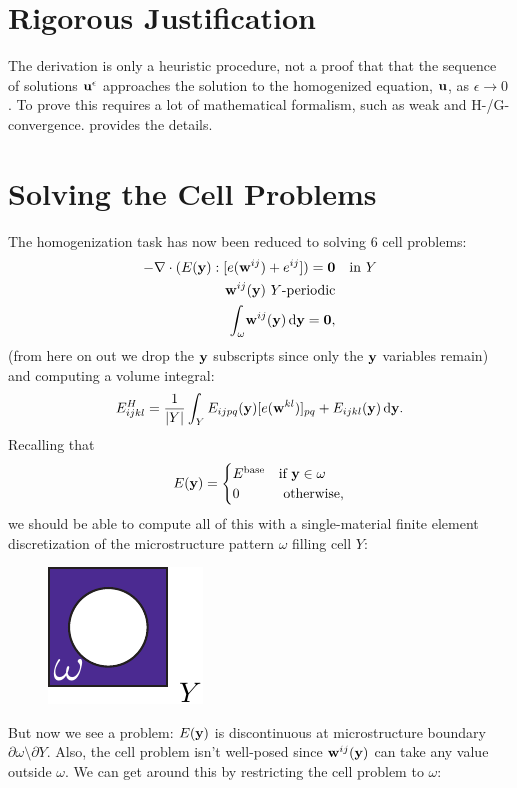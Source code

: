 \documentclass[10pt]{article}
\providecommand{\e}{\epsilon}
\begin{document}
\section{Rigorous Justification}
The derivation is only a heuristic procedure, not a proof that that the
sequence of solutions ${\bf u}^\e$ approaches the solution to the
homogenized equation, ${\bf u}$, as $\e \to 0$ . To prove this requires a lot of mathematical
formalism, such as weak and H-/G-convergence. \cite{allaire2002shape} provides the details.

\section{Solving the Cell Problems}
The homogenization task has now been reduced to solving 6 cell problems:
\begin{align*}
    -\nabla \cdot (E({\bf y}) : [e({\bf w}^{ij}) + e^{ij}]) = {\bf 0} & \quad \text{in } Y \\
    {\bf w}^{ij}({\bf y})\ Y \text{-periodic} & \\
    \int_\omega \! {\bf w}^{ij}({\bf y})  \, \mathrm{d} {\bf y} =  {\bf 0}, 
\end{align*}
(from here on out we drop the ${\bf y}$ subscripts since only the ${\bf y}$
variables remain) and computing a volume integral:
$$
E^H_{ijkl} = \frac{1}{|Y|} \int_Y E_{ijpq}({\bf y}) [e({\bf w}^{kl})]_{pq} + E_{ijkl}({\bf y}) \, \mathrm{d} {\bf y}.
$$
Recalling that 
$$
E ({\bf y}) = \begin{cases} E^\text{base} & \text{if } {\bf y} \in \omega \\
                                 0 & \text{ otherwise,} \end{cases}
$$
we should be able to compute all of this with a single-material finite element discretization
of the microstructure pattern $\omega$ filling cell $Y$:
\begin{figure}[H]
    \centering
    \includegraphics[width=.16\textwidth]{Images/cell.pdf}
\end{figure}
But now we see a problem: $E({\bf y})$ is discontinuous at microstructure boundary $\partial \omega \setminus \partial Y$. Also,
the cell problem isn't well-posed since ${\bf w}^{ij}({\bf y})$ can take any
value outside $\omega$. We can get around this by restricting the cell problem to $\omega$:
\end{document}
